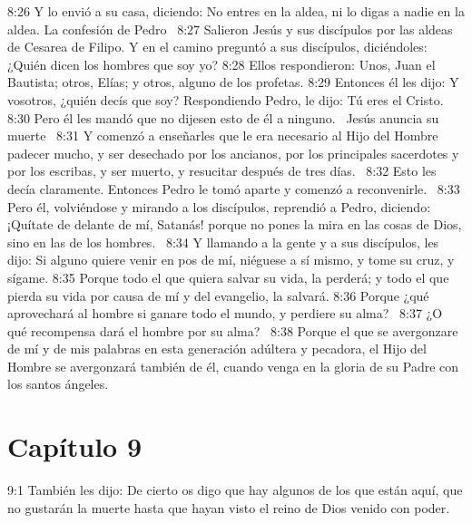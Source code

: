 8:26 Y lo envió a su casa, diciendo: No entres en la aldea, ni lo digas a nadie en la aldea. 
La confesión de Pedro   
8:27 Salieron Jesús y sus discípulos por las aldeas de Cesarea de Filipo. Y en el camino preguntó a sus discípulos, diciéndoles: ¿Quién dicen los hombres que soy yo? 
8:28 Ellos respondieron: Unos, Juan el Bautista; otros, Elías; y otros, alguno de los profetas. 
8:29 Entonces él les dijo: Y vosotros, ¿quién decís que soy? Respondiendo Pedro, le dijo: Tú eres el Cristo. 
8:30 Pero él les mandó que no dijesen esto de él a ninguno.  
Jesús anuncia su muerte   
8:31 Y comenzó a enseñarles que le era necesario al Hijo del Hombre padecer mucho, y ser desechado por los ancianos, por los principales sacerdotes y por los escribas, y ser muerto, y resucitar después de tres días.  
8:32 Esto les decía claramente. Entonces Pedro le tomó aparte y comenzó a reconvenirle.  
8:33 Pero él, volviéndose y mirando a los discípulos, reprendió a Pedro, diciendo: ¡Quítate de delante de mí, Satanás! porque no pones la mira en las cosas de Dios, sino en las de los hombres.  
8:34 Y llamando a la gente y a sus discípulos, les dijo: Si alguno quiere venir en pos de mí, niéguese a sí mismo, y tome su cruz, y sígame. 
8:35 Porque todo el que quiera salvar su vida, la perderá; y todo el que pierda su vida por causa de mí y del evangelio, la salvará. 
8:36 Porque ¿qué aprovechará al hombre si ganare todo el mundo, y perdiere su alma?  
8:37 ¿O qué recompensa dará el hombre por su alma?  
8:38 Porque el que se avergonzare de mí y de mis palabras en esta generación adúltera y pecadora, el Hijo del Hombre se avergonzará también de él, cuando venga en la gloria de su Padre con los santos ángeles.  
\section*{Capítulo 9}
9:1 También les dijo: De cierto os digo que hay algunos de los que están aquí, que no gustarán la muerte hasta que hayan visto el reino de Dios venido con poder. 

